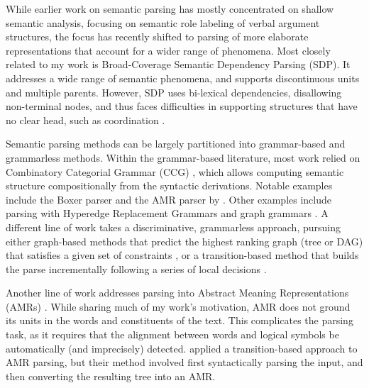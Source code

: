 \documentclass[12pt,a4paper]{report}
\begin{document}
While earlier work on semantic parsing has mostly concentrated on shallow semantic analysis,
focusing on semantic role labeling of verbal argument structures,
the focus has recently shifted to parsing of more elaborate representations that account
for a wider range of phenomena. 
Most closely related to my work is Broad-Coverage Semantic Dependency Parsing (SDP).
It addresses a wide range of semantic phenomena,
and supports discontinuous units and multiple parents.
However, SDP uses
bi-lexical dependencies, disallowing non-terminal nodes, and thus faces difficulties in supporting
structures that have no clear head, such as coordination \cite{Ivanova2012who}.

Semantic parsing methods can be largely partitioned into grammar-based and grammarless methods.
Within the grammar-based literature, most work relied on Combinatory Categorial Grammar (CCG)
\cite{Steedman:00}, which allows computing semantic structure compositionally from the
syntactic derivations. Notable examples include the Boxer parser \cite{bos2005towards}
and the AMR parser by \cite{artzi2015broad}.
Other examples include parsing with Hyperedge Replacement Grammars
\cite{jones2012semantics,chiang2013parsing,peng2015synchronous} and
graph grammars \cite{koller2015semantic}.
A different line of work takes a discriminative, grammarless approach,
pursuing either graph-based methods that predict the highest ranking graph
(tree or DAG) that satisfies a given set of constraints
\cite[for AMR parsing]{flanigan2014discriminative},
or a transition-based method
that builds the parse incrementally following a series of local
decisions \cite{Nivre03anefficient}.

Another line of work addresses parsing into Abstract Meaning Representations (AMRs)
\cite{flanigan2014discriminative,vanderwende2015amr,pust2015parsing,artzi2015broad}. 
While sharing much of my work's motivation,
AMR does not ground its units in the words and constituents of the text.
This complicates the parsing task, as it requires
that the alignment between words and logical symbols be automatically
(and imprecisely) detected.
\cite{wang2015transition} applied a transition-based approach to AMR parsing,
but their method involved first syntactically parsing the input, and then converting
the resulting tree into an AMR.
\end{document}
